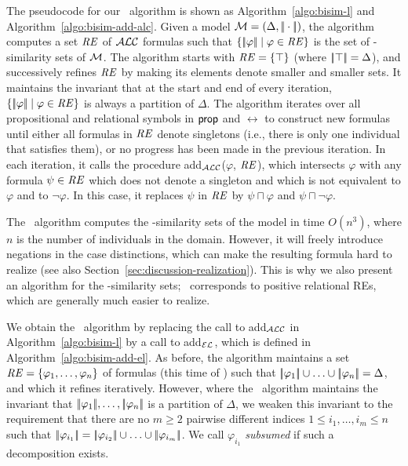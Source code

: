 The pseudocode for our \alc\ algorithm is shown as
Algorithm~\ref{algo:bisim-l} and Algorithm~\ref{algo:bisim-add-alc}.
Given a model $\mathcal{M}=(\Delta, |\!|\cdot|\!|)$, the algorithm computes a
set $\mathit{RE}$ of $\mathcal{ALC}$ formulas such that $\{|\!|\varphi|\!| \mid
\varphi \in \mathit{RE}\}$ is the set of \alc-similarity sets of $\mathcal{M}$.  The
algorithm starts with $\mathit{RE} = \{\top\}$ (where $|\!|\top|\!| =
\Delta$), and successively refines $\mathit{RE}$ by making its elements denote
smaller and smaller sets.  It maintains the invariant that at the
start and end of every iteration, $\{|\!|\varphi|\!| \mid \varphi \in
\mathit{RE}\}$ is always a partition of $\Delta$.  The algorithm iterates over
all propositional and relational symbols in $\mathsf{prop}$ and $\rel$ to
construct new formulas until either all formulas in $\mathit{RE}$ denote
singletons (i.e., there is only one individual that satisfies them),
or no progress has been made in the previous iteration.  In each
iteration, it calls the procedure add$_\mathcal{ALC}$($\varphi$, $\mathit{RE}$), which
intersects $\varphi$ with any formula $\psi \in \mathit{RE}$ which does not
denote a singleton and which is not equivalent to $\varphi$ and to
$\neg \varphi$. In this case, it replaces $\psi$ in $\mathit{RE}$ by $\psi
\sqcap \varphi$ and $\psi \sqcap \neg \varphi$.



The \alc\ algorithm computes the \alc-similarity sets of the model in
time $O(n^3)$, where $n$ is the number of individuals in the domain.
However, it will freely introduce negations in the case distinctions,
which can make the resulting formula hard to realize (see also
Section~\ref{sec:discussion-realization}).  This is why we also
present an algorithm for the \el-similarity sets; \el\ corresponds to
positive relational REs, which are generally much easier to realize.

We obtain the \el\ algorithm by replacing the call to add$_{\mathcal{ALC}}$ in
Algorithm~\ref{algo:bisim-l} by a call to add$_{\mathcal{EL}}$, which is
defined in Algorithm~\ref{algo:bisim-add-el}.  As before, the
algorithm maintains a set $\mathit{RE} = \{\varphi_1,\ldots,\varphi_n\}$ of
formulas (this time of \el) such that $|\!|\varphi_1|\!| \cup \ldots
\cup |\!|\varphi_n|\!| = \Delta$, and which it refines iteratively.
However, where the \alc\ algorithm maintains the invariant that
$|\!|\varphi_1|\!|,\ldots,|\!|\varphi_n|\!|$ is a partition of
$\Delta$, we weaken this invariant to the requirement that there are
no $m \geq 2$ pairwise different indices $1 \leq i_1,\ldots,i_m \leq
n$ such that $|\!|\varphi_{i_1}|\!| = |\!|\varphi_{i_2}|\!| \cup
\ldots \cup |\!|\varphi_{i_m}|\!|$.  We call $\varphi_{i_1}$
\emph{subsumed} if such a decomposition exists.

